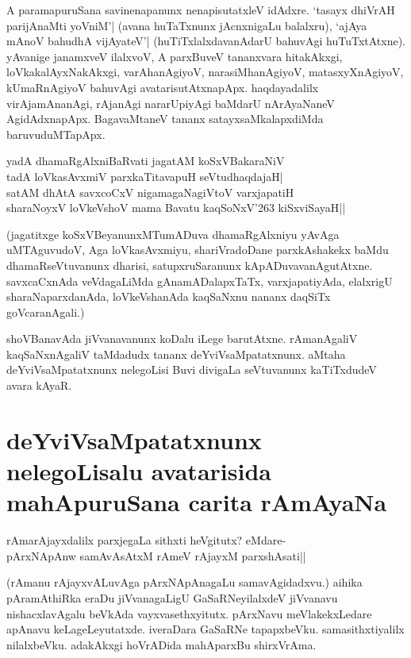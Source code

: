 A paramapuruSana savinenapanunx nenapisutatxleV idAdxre. `tasayx dhiVrAH parijAnaMti yoVniM'| (avana huTaTxnunx jAcnxnigaLu balalxru), `ajAya mAnoV bahudhA vijAyateV'|\label{150a} (huTiTxlalxdavanAdarU bahuvAgi huTuTxtAtxne). yAvanige janamxveV ilalxvoV, A parxBuveV tananxvara hitakAkxgi, loVkakalAyxNakAkxgi, varAhanAgiyoV, narasiMhanAgiyoV, matasxyXnAgiyoV, kUmaRnAgiyoV bahuvAgi avatarisutAtxnapApx. haqdayadalilx virAjamAnanAgi, rAjanAgi nararUpiyAgi baMdarU nArAyaNaneV AgidAdxnapApx. BagavaMtaneV tananx satayxsaMkalapxdiMda baruvuduMTapApx. 

\begin{shloka} 
yadA dhamaRgAlxniBaRvati jagatAM koSxVBakaraNiV\label{150b}\\ 
tadA loVkasAvxmiV parxkaTitavapuH seVtudhaqdajaH|\\ 
satAM dhAtA savxcoCxV nigamagaNagiVtoV varxjapatiH\\ 
sharaNoyxV loVkeVshoV mama Bavatu kaqSoNxV\char'263 kiSxviSayaH||
\end{shloka} 

(jagatitxge koSxVBeyanunxMTumADuva dhamaRgAlxniyu yAvAga uMTAguvudoV, Aga loVkasAvxmiyu, shariVradoDane parxkAshakekx baMdu dhamaRseVtuvanunx dharisi, satupxruSaranunx kApADuvavanAgutAtxne. savxcaCxnAda veVdagaLiMda gAnamADalapxTaTx, varxjapatiyAda, elalxrigU sharaNaparxdanAda, loVkeVshanAda kaqSaNxnu nananx daqSiTx goVcaranAgali.) 

shoVBanavAda jiVvanavanunx koDalu iLege barutAtxne. rAmanAgaliV kaqSaNxnAgaliV taMdadudx tananx deYviVsaMpatatxnunx. aMtaha deYviVsaMpatatxnunx nelegoLisi Buvi divigaLa seVtuvanunx kaTiTxdudeV avara kAyaR. 

\section*{deYviVsaMpatatxnunx nelegoLisalu avatarisida mahApuruSana carita rAmAyaNa} 

\begin{shloka} 
rAmarAjayxdalilx parxjegaLa sithxti heVgitutx? eMdare-\\ 
pArxNApAnw samAvAsAtxM rAmeV rAjayxM parxshAsati||\label{151}
\end{shloka} 

(rAmanu rAjayxvALuvAga pArxNApAnagaLu samavAgidadxvu.) aihika pAramAthiRka eraDu jiVvanagaLigU GaSaRNeyilalxdeV jiVvanavu nishacxlavAgalu beVkAda vayxvasethxyitutx. pArxNavu meVlakekxLedare apAnavu keLageLeyutatxde. iveraDara GaSaRNe tapapxbeVku. samasithxtiyalilx nilalxbeVku. adakAkxgi hoVrADida mahAparxBu shirxVrAma. 

